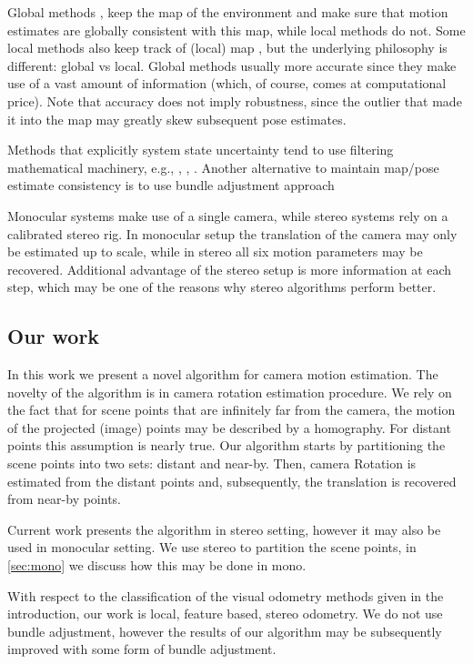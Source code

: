 \documentclass[runningheads]{llncs}
\begin{document}
Global methods \cite{Klein2007}, \cite{Newcombe2011} keep the map of
the environment and make sure that motion estimates are globally
consistent with this map, while local methods do not.  Some local
methods \cite{Badino2013} also keep track of (local) map , but the
underlying philosophy is different: global vs local.  Global methods
usually more accurate since they make use of a vast amount of
information (which, of course, comes at computational price).  Note
that accuracy does not imply robustness, since the outlier that made
it into the map may greatly skew subsequent pose estimates.

Methods that explicitly system state uncertainty tend to use filtering
mathematical machinery, e.g., \cite{Konolige2010}, \cite{Olson2003},
\cite{Kaess2008}.  Another alternative to maintain map/pose estimate
consistency is to use bundle adjustment approach \cite{Triggs2000}

Monocular systems \cite{Song} make use of a single camera, while
stereo systems \cite{Geiger2011} rely on a calibrated stereo rig. In
monocular setup the translation of the camera may only be estimated up
to scale, while in stereo all six motion parameters may be
recovered. Additional advantage of the stereo setup is more
information at each step, which may be one of the reasons why stereo
algorithms perform better.

\subsection{Our work}

In this work we present a novel algorithm for camera motion
estimation.  The novelty of the algorithm is in camera rotation
estimation procedure.  We rely on the fact that for scene points that
are infinitely far from the camera, the motion of the projected
(image) points may be described by a homography. For distant points
this assumption is nearly true.  Our algorithm starts by partitioning
the scene points into two sets: distant and near-by. Then, camera
Rotation is estimated from the distant points and, subsequently, the
translation is recovered from near-by points.

Current work presents the algorithm in stereo setting, however it may
also be used in monocular setting. We use stereo to partition the
scene points, in \ref{sec:mono} we discuss how this may be done in
mono.

With respect to the classification of the visual odometry methods
given in the introduction, our work is local, feature based, stereo
odometry.  We do not use bundle adjustment, however the results of our
algorithm may be subsequently improved with some form of bundle
adjustment.
\end{document}
